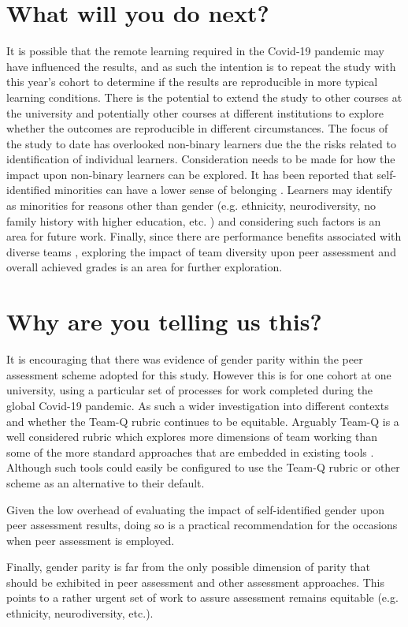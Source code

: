 \documentclass[sigconf, anonymous=true]{acmart}
\begin{document}
\section{What will you do next?}
 It is possible that the remote learning required in the Covid-19 pandemic may have influenced the results, and as such the intention is to repeat the study with this year's cohort to determine if the results are reproducible in more typical learning conditions. There is the potential to extend the study to other courses at the university and potentially other courses at different institutions to explore whether the outcomes are reproducible in different circumstances. The focus of the study to date has overlooked non-binary learners due the the risks related to identification of individual learners. Consideration needs to be made for how the impact upon non-binary learners can be explored. It has been reported that self-identified minorities can have a lower sense of belonging \cite{Mooney2020}. Learners may identify as minorities for reasons other than gender (e.g. ethnicity, neurodiversity, no family history with higher education, etc. ) and considering such factors is an area for future work. Finally, since there are performance benefits associated with diverse teams \cite{HBR206}, exploring the impact of team diversity upon peer assessment and overall achieved grades is an area for further exploration.


\section{Why are you telling us this?}
It is encouraging that there was evidence of gender parity within the peer assessment scheme adopted for this study. However this is for one cohort at one university, using a particular set of processes for work completed during the global Covid-19 pandemic. As such a wider investigation into different contexts and whether the Team-Q rubric continues to be equitable. Arguably Team-Q is a well considered rubric which explores more dimensions of team working than some of the more standard approaches that are embedded in existing tools \cite{WebPA,BuddyCheck,SparkPlus}. Although such tools could easily be configured to use the Team-Q rubric or other scheme as an alternative to their default.

Given the low overhead of evaluating the impact of self-identified gender upon peer assessment results, doing so is a practical recommendation for the occasions when peer assessment is employed.

Finally, gender parity is far from the only possible dimension of parity that should be exhibited in peer assessment and other assessment approaches. This points to a rather urgent set of work to assure assessment remains equitable (e.g. ethnicity, neurodiversity, etc.). 


\end{document}

